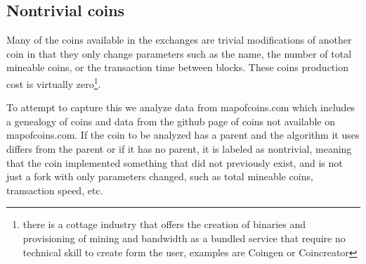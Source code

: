 \subsection{Nontrivial coins}

Many of the coins available in the exchanges are trivial modifications of another coin in that they only change parameters such as the name, the number of total mineable coins, or the transaction time between blocks.
These coins production cost is virtually zero\footnote{ there is a cottage industry that offers the creation of binaries and provisioning of mining and bandwidth as a bundled service that require no technical skill to create form the user, examples are Coingen or Coincreator}.

To attempt to capture this we analyze data from mapofcoins.com which includes a genealogy of coins and data from the github page of coins not available on mapofcoins.com.
If the coin to be analyzed has a parent and the algorithm it uses differs from the parent or if it has no parent, it is labeled as nontrivial, meaning that the coin implemented something that did not previously exist, and is not just a fork with only parameters changed, such as total mineable coins, transaction speed, etc.

